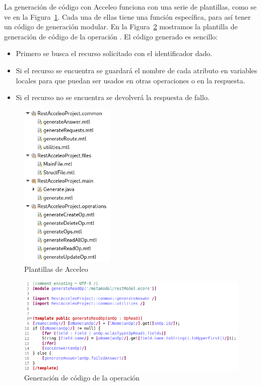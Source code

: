 \documentclass[runningheads]{llncs}
\begin{document}
La generación de código con Acceleo funciona con una serie de
plantillas, como se ve en la Figura~\ref{fig:acceleo-files}. Cada una
de ellas tiene una función específica, para así tener un código
de generación modular. En la Figura~\ref{fig:gen-read} mostramos la
plantilla de generación de código de la operación \READ. El código generado
es sencillo:

\begin{itemize}
    \item Primero se busca el recurso solicitado con el identificador dado.
    \item Si el recurso se encuentra se guardará el nombre de cada atributo
        en variables locales para que puedan ser usados en otras
        operaciones o en la respuesta.
    \item Si el recurso no se encuentra se devolverá la respuesta de fallo.
\end{itemize}

\begin{figure}
    \centering
    \includegraphics[width=0.4\textwidth]{acceleo-files}
    \caption{Plantillas de Acceleo}
    \label{fig:acceleo-files}
\end{figure}

\begin{figure}
    \centering
    \includegraphics[width=\textwidth]{generateReadOp}
    \caption{Generación de código de la operación \READ}
    \label{fig:gen-read}
\end{figure}
\end{document}
